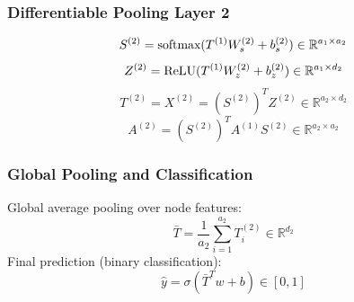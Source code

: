 \documentclass[conference]{IEEEtran}
\begin{document}
\subsubsection{Differentiable Pooling Layer 2}
\begin{equation}
    S^{(2)} = \textnormal{softmax}(T^{(1)}W_s^{(2)} + b_s^{(2)}) \in \mathbb{R}^{a_1 \times a_2}
    \label{eq:diffpool_2_S}
\end{equation}
\begin{equation}
    Z^{(2)} = \textnormal{ReLU}(T^{(1)}W_z^{(2)} + b_z^{(2)}) \in \mathbb{R}^{a_1 \times d_2}
    \label{eq:diffpool_2_Z}
\end{equation}
\begin{equation}
    T^{(2)} = X^{(2)} = (S^{(2)})^T Z^{(2)} \in \mathbb{R}^{a_2 \times d_2}
    \label{eq:diffpool_2_T}
\end{equation}
\begin{equation}
    A^{(2)} = (S^{(2)})^T A^{(1)} S^{(2)} \in \mathbb{R}^{a_2 \times a_2}
    \label{eq:diffpool_2_A}
\end{equation}

\subsubsection{Global Pooling and Classification}
\textnormal{Global average pooling over node features:}
\begin{equation}
    \bar{T} = \frac{1}{a_2} \sum_{i = 1}^{a_2} T^{(2)}_i \in \mathbb{R}^{d_2}
    \label{eq:global_pooling_diff}
\end{equation}
\textnormal{Final prediction (binary classification):}
\begin{equation}
    \hat{y} = \sigma(\bar{T}^T w + b) \in [0, 1]
    \label{eq:final_prediction_diff}
\end{equation}
\end{document}
